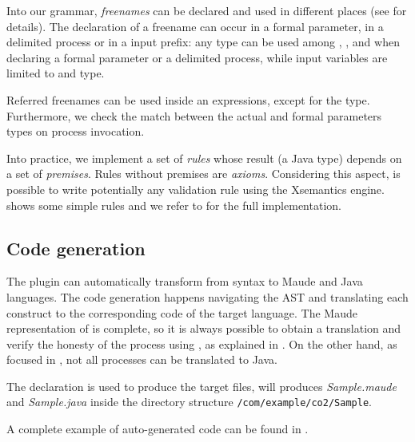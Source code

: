 Into our grammar, \textit{freenames} can be declared and used in different places (see  for details). The declaration of a freename can occur in a formal parameter, in a delimited process or in a input prefix: any type can be used among , ,  and  when declaring a formal parameter or a delimited process, while input variables are limited to  and  type.

Referred freenames can be used inside an expressions, except for the  type. Furthermore, we check the match between the actual and formal parameters types on process invocation.


Into practice, we implement a set of \textit{rules} whose result (a Java type) depends on a set of \textit{premises}. Rules without premises are \textit{axioms}. Considering this aspect, is possible to write potentially any validation rule using the Xsemantics engine.  shows some simple rules and we refer to  for the full implementation.


\subsection{Code generation}
The plugin can automatically transform from \coco syntax to Maude and Java languages.
The code generation happens navigating the AST and translating each \coco construct to the corresponding code of the target language. The Maude representation of \coco is complete, so it is always possible to obtain a translation and verify the honesty of the process using \cite{verifiable}, as explained in . On the other hand, as focused in , not all processes can be translated to Java.

The  declaration is used to produce the target files, \eg {}  will produces \textit{Sample.maude} and \textit{Sample.java} inside the directory structure \texttt{/com/example/co2/Sample}.

A complete example of auto-generated code can be found in .
